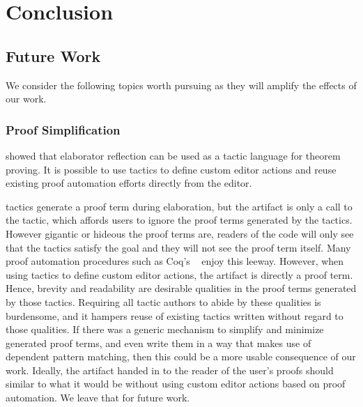 \section{Conclusion}\label{sec:conclusion}

\subsection{Future Work}

We consider the following topics worth pursuing as they will amplify the effects
of our work.

\subsubsection{Proof Simplification}
\label{sssec:simplification}

\citet{elabref} showed that elaborator reflection can be used as a tactic
language for theorem proving. It is possible to use \Elab{} tactics to define
custom editor actions and reuse existing proof automation efforts directly from
the editor.

\Elab{} tactics generate a proof term during elaboration, but the artifact is
only a call to the tactic, which affords users to ignore the proof terms
generated by the tactics. However gigantic or hideous the proof terms are,
readers of the code will only see that the tactics satisfy the goal and they
will not see the proof term itself. Many proof automation procedures such as
Coq's ~\cite{omega} enjoy this leeway.
However, when using \Elab{} tactics to
define custom editor actions, the artifact is directly a proof term. Hence,
brevity and readability are desirable qualities in the proof terms generated by
those tactics.
Requiring all tactic authors to abide by these qualities is burdensome, and it
hampers reuse of existing tactics written without regard to those qualities.
If there was a generic mechanism to simplify and minimize
generated proof terms, and even write them in a way that makes use of dependent
pattern matching, then this could be a more usable consequence of our work.
Ideally, the artifact handed in to the reader of the user's proofs should
similar to what it would be without using custom editor actions based on proof
automation.  We leave that for future work.


